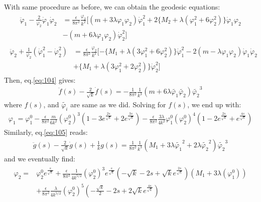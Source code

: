 With same procedure as before, we can obtain the geodesic equations:
\begin{align}
    \label{eq:104}
    \begin{split}
    \ddot \varphi_{1} - \frac{2}{\varphi_{2}} \dot \varphi_{1} \dot \varphi_{2} &= \frac{\epsilon}{8\pi^{2}} \frac{\varphi_{2}}{k^{2}}[(m+3\lambda\varphi_{1}\varphi_{2})\dot \varphi_{1}^{2} + 2\lbrace M_{2} + \lambda(\varphi_{1}^{2} + 6\varphi_{2}^{2})\rbrace \dot \varphi_{1}\varphi_{2}  \\
    & - (m+6\lambda\varphi_{1}\varphi_{2})\dot \varphi_{2} ^{2}]
    \end{split}
\end{align}
\begin{align}
    \label{eq:105}
    \begin{split}
    \ddot \varphi_{2} + \frac{1}{\varphi_{2}} (\dot \varphi_{1}^{2} - \dot \varphi_{2}^{2}) &= \frac{\epsilon}{8\pi^{2}}\frac{\varphi_{2}}{k^{2}} [-\lbrace M_{1} +\lambda(3\varphi_{1}^{2} + 6\varphi_{2}^{2})\rbrace \dot \varphi_{1}^{2} - 2(m-\lambda\varphi_{1} \varphi_{2})\dot \varphi_{1} \dot \varphi_{2}  \\
    & + \lbrace M_{1} + \lambda (3\varphi_{1}^{2} + 2\varphi_{2}^{2}) \rbrace \dot \varphi_{2}^{2}]
    \end{split}
\end{align}
Then, eq.\ref{eq:104} gives:
\begin{align}
    \ddot f (s) - \frac{2}{\sqrt{k}} \dot f(s) = -\frac{1}{8\pi^{2}}\frac{1}{k^{3}}(m+6\lambda \tilde{\varphi_{1}} \tilde{\varphi_{2}})\tilde{\varphi_{2}}^{3}
\end{align}
where $f(s)$, and $\tilde{\varphi_{i}}$ are same as we did. Solving for $f(s)$, we end up with:
\begin{align}
    \varphi_{1} = \varphi_{1}^{0} - \frac{\epsilon}{8\pi^{2}} \frac{m}{6k^{2}} (\varphi_{2}^{0})^{3} (1-3e^{\frac{2s}{\sqrt{k}}} + 2e^{\frac{3s}{\sqrt{k}}}) - \frac{\epsilon}{8\pi^{2}}\frac{3\lambda}{4k^{2}}\varphi_{1}^{0} (\varphi_{2}^{0})^{4} (1-2e^{\frac{2s}{\sqrt{k}}} + e^{\frac{4s}{\sqrt{k}}})
\end{align}
Similarly, eq.\ref{eq:105} reads:
\begin{align}
    \ddot g(s) - \frac{2}{\sqrt{k}} \dot g(s) +\frac{1}{k}g(s) = \frac{1}{8\pi^{2}}\frac{1}{k^{3}} (M_{1} + 3\lambda \tilde{\varphi_{1}}^{2} + 2\lambda \tilde{\varphi_{2}}^{2})\tilde{\varphi_{2}} ^{3}
\end{align}
and we eventually find:
\begin{align}
    \begin{split}
        \varphi_{2}  = & \varphi_{2} ^{0} e^{\frac{s}{\sqrt{k}}} + \frac{\epsilon}{8\pi^{2}}\frac{1}{4k^{5/2}}(\varphi_{2}^{0})^{3} e^{\frac{s}{\sqrt{k}}} (-\sqrt{k} - 2s + \sqrt{k} e^{\frac{2s}{\sqrt{k}}})(M_{1} + 3\lambda (\varphi_{1}^{0})) \\
        & + \frac{\epsilon}{8\pi^{2}} \frac{\lambda}{4k^{5/2}} (\varphi_{2}^{0})^{5} (-\frac{\sqrt{k}}{2} - 2s + 2\sqrt{k}e^{\frac{4s}{\sqrt{k}}})
    \end{split}
\end{align}
